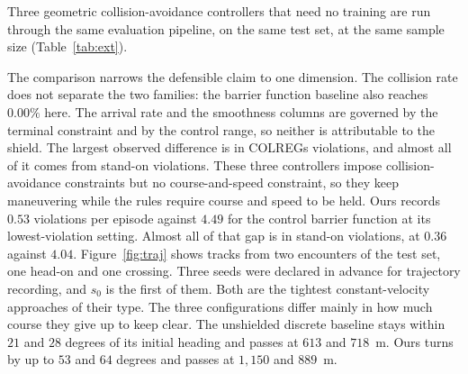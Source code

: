 \documentclass[10pt,letterpaper]{article}
\begin{document}
Three geometric collision-avoidance controllers that need no training are run through the
same evaluation pipeline, on the same test set, at the same sample size
(Table~\ref{tab:ext}).

The comparison narrows the defensible claim to one dimension. The collision rate does
not separate the two families: the barrier function baseline also reaches $0.00\%$ here. The arrival rate and the smoothness columns are governed by the terminal constraint and
by the control range, so neither is attributable to the shield.
The largest observed difference is in COLREGs violations, and almost all of it comes
from stand-on violations. These three controllers impose collision-avoidance constraints but no course-and-speed
constraint, so they keep maneuvering while the rules require course and speed to be
held.
Ours records $0.53$ violations per episode against $4.49$ for the control barrier
function at its lowest-violation setting. Almost all of that
gap is in stand-on violations, at $0.36$ against $4.04$.
Figure~\ref{fig:traj} shows tracks from two encounters of the test set, one head-on and
one crossing. Three seeds were declared in advance for trajectory recording, and $s_0$ is the first of
them. Both are the tightest constant-velocity approaches of their type. The three
configurations differ mainly in how much course they give up to keep clear. The unshielded discrete baseline stays within $21$
and $28$ degrees of its initial heading and passes at $613$ and $718$~m. Ours turns by
up to $53$ and $64$ degrees and passes at $1{,}150$ and $889$~m.
\end{document}
